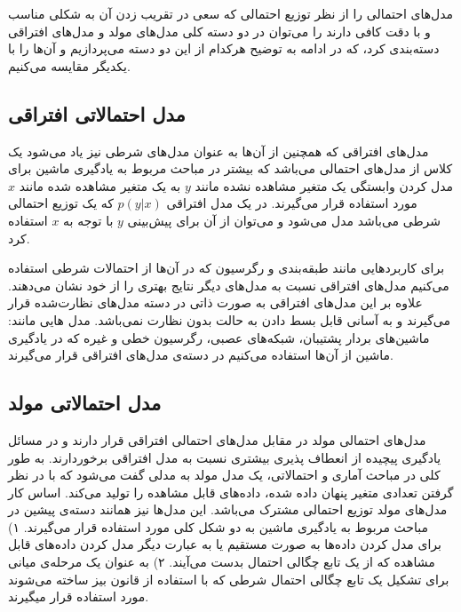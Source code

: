 مدل‌های احتمالی‌ را از نظر توزیع احتمالی‌ که سعی‌ در تقریب زدن آن به شکلی‌ مناسب و با دقت کافی‌ دارند را می‌‌توان در دو دسته کلی‌ مدل‌های مولد
و مدل‌های افتراقی
 دسته‌بندی کرد، که در ادامه به توضیح هرکدام از این دو دسته می‌‌پردازیم و آن‌ها را با یکدیگر مقایسه می‌‌کنیم.

	\subsection{مدل‌ احتمالاتی افتراقی}
	مدل‌های افتراقی که همچنین از آن‌ها به عنوان مدل‌های شرطی
	نیز یاد می‌‌شود یک کلاس از مدل‌های احتمالی‌ می‌‌باشد که بیشتر در مباحث مربوط به یادگیری ماشین
	برای مدل کردن وابستگی یک متغیر مشاهده نشده مانند
	$y$
	به یک متغیر مشاهده شده مانند
	$x$
	مورد استفاده قرار می‌‌گیرند. در یک مدل افتراقی
	$p(y|x)$
	که یک توزیع احتمالی‌ شرطی می‌‌باشد مدل می‌‌شود و می‌‌توان از آن برای پیش‌بینی‌
	$y$
	با توجه به
	$x$
	استفاده کرد.
	
	برای کاربردهایی مانند طبقه‌بندی
	و رگرسیون
	که در آن‌ها از احتمالات شرطی استفاده می‌‌کنیم مدل‌های افتراقی نسبت به مدل‌های دیگر نتایج بهتری را از خود نشان می‌‌دهند. علاوه بر این مدل‌های افتراقی به صورت ذاتی در دسته مدل‌های نظارت‌شده
	قرار می‌‌گیرند و به آسانی‌ قابل بسط دادن به حالت بدون نظارت
	نمی‌‌باشد. مدل هایی مانند: ماشین‌های بردار پشتیبان،
	 شبکه‌های عصبی، 
	 رگرسیون خطی‌
	  و غیره که در یادگیری ماشین از آن‌ها استفاده می‌‌کنیم در دسته‌ی مدل‌های افتراقی قرار می‌‌گیرند.
	
	\subsection{مدل‌ احتمالاتی مولد}
	\label{chap2sec3sub2}
	مدل‌های احتمالی‌ مولد در مقابل مدل‌های احتمالی‌ افتراقی قرار دارند و در مسائل یادگیری پیچیده از انعطاف پذیری بیشتری نسبت به مدل افتراقی برخوردارند. به طور کلی‌ در مباحث آماری و احتمالاتی، یک مدل مولد به مدلی‌ گفت می‌‌شود که با در نظر گرفتن تعدادی متغیر پنهان داده شده، داده‌های قابل مشاهده را تولید می‌‌کند. اساس کار مدل‌های مولد توزیع احتمالی‌ مشترک
	می‌‌باشد. این مدل‌ها نیز همانند دسته‌ی پیشین در مباحث مربوط به یادگیری ماشین به دو شکل کلی‌ مورد استفاده قرار می‌‌گیرند. ۱) برای مدل کردن داده‌ها به صورت مستقیم یا به عبارت دیگر مدل کردن داده‌های قابل مشاهده که از یک تابع چگالی احتمال
	بدست می‌‌آیند. ۲) به عنوان یک مرحله‌ی میانی برای تشکیل یک تابع چگالی احتمال شرطی
	که با استفاده از قانون بیز
	 ساخته می‌‌شوند مورد استفاده قرار میگیرند.
	
